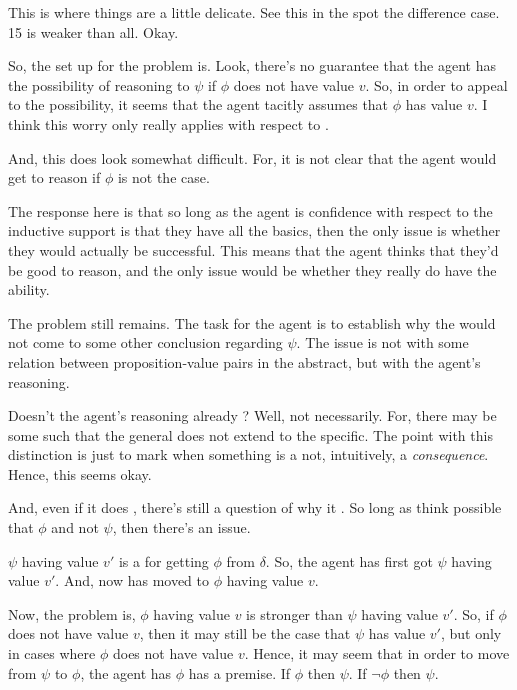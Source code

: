 \begin{note}
  This is where things are a little delicate.
  See this in the spot the difference case.
  15 is weaker than all.
  Okay.

  So, the set up for the problem is.
  Look, there's no guarantee that the agent has the possibility of reasoning to \(\psi\) if \(\phi\) does not have value \(v\).
  So, in order to appeal to the possibility, it seems that the agent tacitly assumes that \(\phi\) has value \(v\).
  I think this worry only really applies with respect to \LCS{}.

  And, this does look somewhat difficult.
  For, it is not clear that the agent would get to reason if \(\phi\) is not the case.

  The response here is that so long as the agent is confidence with respect to the inductive support is that they have all the basics, then the only issue is whether they would actually be successful.
  This means that the agent thinks that they'd be good to reason, and the only issue would be whether they really do have the ability.

  The problem still remains.
  The task for the agent is to establish why the would not come to some other conclusion regarding \(\psi\).
  The issue is not with some relation between proposition-value pairs in the abstract, but with the agent's reasoning.

  Doesn't the agent's reasoning already \indicateN{}?
  Well, not necessarily.
  For, there may be some \epPW{} such that the general does not extend to the specific.
  The point with this distinction is just to mark when something is a not, intuitively, a \emph{consequence}.
  Hence, this seems okay.

  And, even if it does \indicateV{}, there's still a question of why it \indicateV{}.
  So long as think possible that \(\phi\) and not \(\psi\), then there's an issue.


  \(\psi\) having value \(v'\) is a \requ{} for getting \(\phi\) from \(\delta\).
  So, the agent has first got \(\psi\) having value \(v'\).
  And, now has moved to \(\phi\) having value \(v\).

  Now, the problem is,
  \(\phi\) having value \(v\) is stronger than \(\psi\) having value \(v'\).
  So, if \(\phi\) does not have value \(v\), then it may still be the case that \(\psi\) has value \(v'\), but only in cases where \(\phi\) does not have value \(v\).
  Hence, it may seem that in order to move from \(\psi\) to \(\phi\), the agent has \(\phi\) has a premise.
  If \(\phi\) then \(\psi\).
  If \(\lnot\phi\) then \(\psi\).


\end{note}
